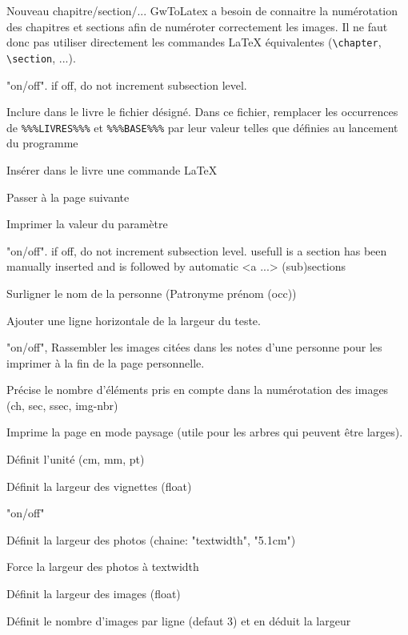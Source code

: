 \begin{description}[style=nextline]
\item[Chapter/Section/SubSection/SubSubSection"] Nouveau chapitre/section/...
GwToLatex a besoin de connaitre la numérotation des chapitres et sections afin 
de numéroter correctement les images. Il ne faut donc pas utiliser directement
les commandes LaTeX équivalentes (\verb|\chapter|, \verb|\section|, ...). 
\item["BumpSub"] "on/off". if off, do not increment subsection level.

\item["Input"] Inclure dans le livre le fichier désigné. Dans ce fichier,
remplacer les occurrences de \verb|%%%LIVRES%%%| et \verb|%%%BASE%%%| par
leur valeur telles que définies au lancement du programme 
\item["LaTeX"] Insérer dans le livre une commande LaTeX
\item["Newpage"] Passer à la page suivante
\item["Print"] Imprimer la valeur du paramètre

\item["BumpSub"] "on/off". if off, do not increment subsection level.
usefull is a section has been manually inserted and
is followed by automatic <a ...> (sub)sections
\item["HighLight"] Surligner le nom de la personne (Patronyme prénom (occ))
\item["Hrule"] Ajouter une ligne horizontale de la largeur du teste.

\item["CollectImages"] "on/off", Rassembler les images citées dans les notes
d'une personne pour les imprimer à la fin de la page personnelle.
\item["ImageLabel"] Précise le nombre d'éléments pris en compte dans 
la numérotation des images (ch, sec, ssec, img-nbr)
\item["Sideways"] Imprime la page en mode paysage (utile pour les arbres
qui peuvent être larges).\label{sideways}
\item["Unit"] Définit l'unité (cm, mm, pt)
\item["VignWidth"] Définit la largeur des vignettes (float)
\item["Wide"] "on/off"
\item["ImageWidth"] Définit la largeur des photos (chaine: "textwidth", "5.1cm")
\item["WideImage"] Force la largeur des photos à textwidth
\item["Width"] Définit la largeur des images (float)
\item["NbImgPerLine"] Définit le nombre d'images par ligne (defaut 3) et en
déduit la largeur


\end{description}

